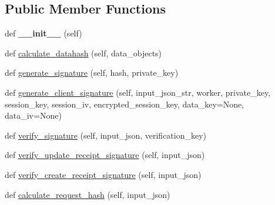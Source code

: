 \subsection*{Public Member Functions}
\begin{DoxyCompactItemize}
\item 
\mbox{\label{classavalon__crypto__utils_1_1signature_1_1ClientSignature_a06315eaf37bfee2701ef6b820f239c61}} 
def {\bfseries \+\_\+\+\_\+init\+\_\+\+\_\+} (self)
\item 
def \hyperlink{classavalon__crypto__utils_1_1signature_1_1ClientSignature_af50cc9b76282c533212796bd11bd8f2a}{calculate\+\_\+datahash} (self, data\+\_\+objects)
\item 
def \hyperlink{classavalon__crypto__utils_1_1signature_1_1ClientSignature_a3ab018d83dee017cac1091782a96ccd0}{generate\+\_\+signature} (self, hash, private\+\_\+key)
\item 
def \hyperlink{classavalon__crypto__utils_1_1signature_1_1ClientSignature_a7b2f9bc1089a8b2ca364483d0dc4733b}{generate\+\_\+client\+\_\+signature} (self, input\+\_\+json\+\_\+str, worker, private\+\_\+key, session\+\_\+key, session\+\_\+iv, encrypted\+\_\+session\+\_\+key, data\+\_\+key=None, data\+\_\+iv=None)
\item 
def \hyperlink{classavalon__crypto__utils_1_1signature_1_1ClientSignature_a2d4afec5e477fd662e776d77efff432b}{verify\+\_\+signature} (self, input\+\_\+json, verification\+\_\+key)
\item 
def \hyperlink{classavalon__crypto__utils_1_1signature_1_1ClientSignature_aff053b50910de8feb0e5fc112e2d17db}{verify\+\_\+update\+\_\+receipt\+\_\+signature} (self, input\+\_\+json)
\item 
def \hyperlink{classavalon__crypto__utils_1_1signature_1_1ClientSignature_a322bfb1cd3cb921595d6d1860904ec43}{verify\+\_\+create\+\_\+receipt\+\_\+signature} (self, input\+\_\+json)
\item 
def \hyperlink{classavalon__crypto__utils_1_1signature_1_1ClientSignature_a30a724087019727c3b9418566f246ff2}{calculate\+\_\+request\+\_\+hash} (self, input\+\_\+json)
\end{DoxyCompactItemize}

